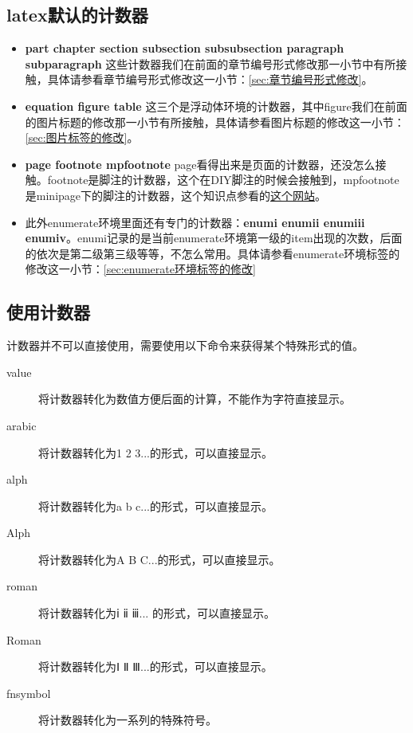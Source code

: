 \documentclass[12pt,oneside]{book}
\begin{document}
\begin{common-format}
\subsection{latex默认的计数器}
\begin{itemize}
\item \textbf{part chapter section subsection subsubsection paragraph \linebreak subparagraph} 这些计数器我们在前面的章节编号形式修改那一小节中有所接触，具体请参看章节编号形式修改这一小节：\ref{sec:章节编号形式修改}。
\item \textbf{equation figure table} 这三个是浮动体环境的计数器，其中figure我们在前面的图片标题的修改那一小节有所接触，具体请参看图片标题的修改这一小节：\ref{sec:图片标签的修改}。
\item \textbf{page footnote mpfootnote} page看得出来是页面的计数器，还没怎么接触。footnote是脚注的计数器，这个在DIY脚注的时候会接触到，mpfootnote是minipage下的脚注的计数器，这个知识点参看的\href{http://tex.stackexchange.com/questions/18499/how-to-change-symbol-for-footnote-in-minipage}{这个网站}。
\item 此外enumerate环境里面还有专门的计数器：\textbf{enumi enumii enumiii enumiv}。enumi记录的是当前enumerate环境第一级的item出现的次数，后面的依次是第二级第三级等等，不怎么常用。具体请参看enumerate环境标签的修改这一小节：\ref{sec:enumerate环境标签的修改}
\end{itemize}



\subsection{使用计数器}
计数器并不可以直接使用，需要使用以下命令来获得某个特殊形式的值。
\begin{description}
\item[value] 将计数器转化为数值方便后面的计算，不能作为字符直接显示。
\item[arabic] 将计数器转化为1 2 3...的形式，可以直接显示。
\item[alph] 将计数器转化为a b c...的形式，可以直接显示。
\item[Alph] 将计数器转化为A B C...的形式，可以直接显示。
\item[roman] 将计数器转化为ⅰ ⅱ ⅲ... 的形式，可以直接显示。
\item[Roman] 将计数器转化为Ⅰ Ⅱ Ⅲ...的形式，可以直接显示。
\item[fnsymbol] 将计数器转化为一系列的特殊符号。
\end{description}


\end{common-format}
\end{document}
